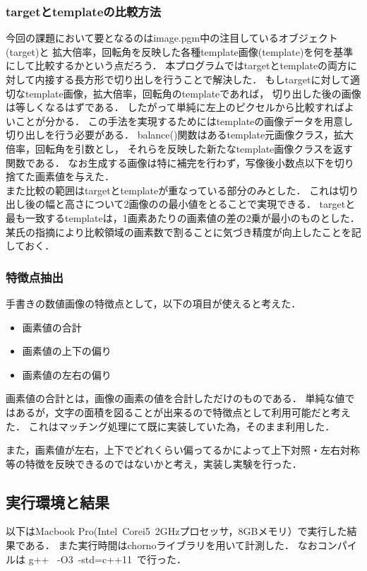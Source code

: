 \documentclass[platex,dvipdfmx]{jsarticle}
\begin{document}
\subsubsection{targetとtemplateの比較方法}
今回の課題において要となるのはimage.pgm中の注目しているオブジェクト(target)と
拡大倍率，回転角を反映した各種template画像(template)を何を基準にして比較するかという点だろう．
本プログラムではtargetとtemplateの両方に対して内接する長方形で切り出しを行うことで解決した．
もしtargetに対して適切なtemplate画像，拡大倍率，回転角のtemplateであれば，
切り出した後の画像は等しくなるはずである．
したがって単純に左上のピクセルから比較すればよいことが分かる．
この手法を実現するためにはtemplateの画像データを用意し切り出しを行う必要がある．
balance()関数はあるtemplate元画像クラス，拡大倍率，回転角を引数とし，
それらを反映した新たなtemplate画像クラスを返す関数である．
なお生成する画像は特に補完を行わず，写像後小数点以下を切り捨てた画素値を与えた．\\



また比較の範囲はtargetとtemplateが重なっている部分のみとした．
これは切り出し後の幅と高さについて2画像のの最小値をとることで実現できる．
targetと最も一致するtemplateは，1画素あたりの画素値の差の2乗が最小のものとした．
某氏の指摘により比較領域の画素数で割ることに気づき精度が向上したことを記しておく．
\newpage


\subsubsection{特徴点抽出}
手書きの数値画像の特徴点として，以下の項目が使えると考えた．
\begin{itemize}
	\item{画素値の合計}
	\item{画素値の上下の偏り}
	\item{画素値の左右の偏り}
\end{itemize}
画素値の合計とは，画像の画素の値を合計しただけのものである．
単純な値ではあるが，文字の面積を図ることが出来るので特徴点として利用可能だと考えた．
これはマッチング処理にて既に実装していた為，そのまま利用した．

また，画素値が左右，上下でどれくらい偏ってるかによって上下対照・左右対称等の特徴を反映できるのではないかと考え，実装し実験を行った．

\newpage
\subsection{実行環境と結果}
以下はMacbook Pro(Intel~Corei5~2GHzプロセッサ，8GBメモリ）で実行した結果である．
また実行時間はchornoライブラリを用いて計測した．
なおコンパイルは g++ ~-O3~-std=c++11~で行った．
\end{document}
